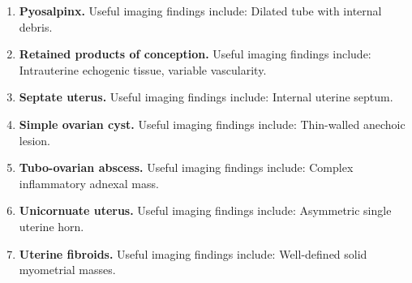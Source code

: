 \begin{enumerate}[leftmargin=*,itemsep=0.45em,topsep=0.4em]
\item \textbf{Pyosalpinx.} Useful imaging findings include: Dilated tube with internal debris.
\item \textbf{Retained products of conception.} Useful imaging findings include: Intrauterine echogenic tissue, variable vascularity.
\item \textbf{Septate uterus.} Useful imaging findings include: Internal uterine septum.
\item \textbf{Simple ovarian cyst.} Useful imaging findings include: Thin-walled anechoic lesion.
\item \textbf{Tubo-ovarian abscess.} Useful imaging findings include: Complex inflammatory adnexal mass.
\item \textbf{Unicornuate uterus.} Useful imaging findings include: Asymmetric single uterine horn.
\item \textbf{Uterine fibroids.} Useful imaging findings include: Well-defined solid myometrial masses.
\end{enumerate}

